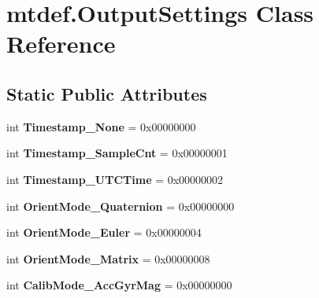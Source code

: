\hypertarget{classmtdef_1_1OutputSettings}{}\section{mtdef.\+Output\+Settings Class Reference}
\label{classmtdef_1_1OutputSettings}
\subsection*{Static Public Attributes}
\begin{DoxyCompactItemize}
\item 
\mbox{\label{classmtdef_1_1OutputSettings_a21f6a1e444c2314ff883095fe41e248a}} 
int {\bfseries Timestamp\+\_\+\+None} = 0x00000000
\item 
\mbox{\label{classmtdef_1_1OutputSettings_aa7e0d190ce08cac459f4042cc7638546}} 
int {\bfseries Timestamp\+\_\+\+Sample\+Cnt} = 0x00000001
\item 
\mbox{\label{classmtdef_1_1OutputSettings_a45702b3c952f82ee815f80d4ddf67acd}} 
int {\bfseries Timestamp\+\_\+\+U\+T\+C\+Time} = 0x00000002
\item 
\mbox{\label{classmtdef_1_1OutputSettings_ae7c4548b20142c4fc887572f61516c01}} 
int {\bfseries Orient\+Mode\+\_\+\+Quaternion} = 0x00000000
\item 
\mbox{\label{classmtdef_1_1OutputSettings_ac88d29ef6f18690b6837490d0ea31437}} 
int {\bfseries Orient\+Mode\+\_\+\+Euler} = 0x00000004
\item 
\mbox{\label{classmtdef_1_1OutputSettings_a0e7cdac578699e9bc8fad8a34a0904aa}} 
int {\bfseries Orient\+Mode\+\_\+\+Matrix} = 0x00000008
\item 
\mbox{\label{classmtdef_1_1OutputSettings_a617223f5f925678751276e19bf1d4e7a}} 
int {\bfseries Calib\+Mode\+\_\+\+Acc\+Gyr\+Mag} = 0x00000000
\item 
\mbox{\label{classmtdef_1_1OutputSettings_a2cc8f0cde270b93e5edcb0014f8c8ff4}} 

\end{DoxyCompactItemize}
